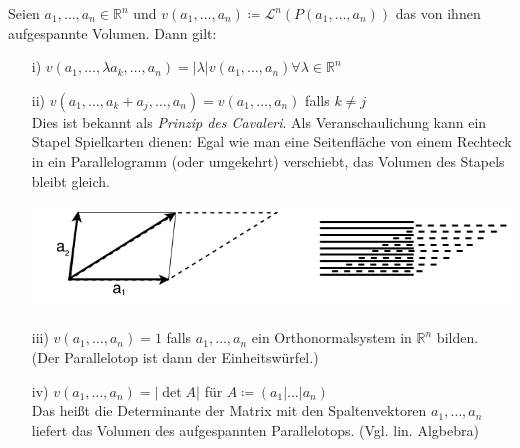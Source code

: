 \begin{satz}
    \mbox{}
    Seien $a_1, \ldots, a_n \in \mathbb{R}^n$ und $v(a_1, \ldots , a_n) \coloneqq \mathcal{L}^n (P (a_1, \ldots, a_n))$ das von ihnen aufgespannte Volumen. Dann gilt:
    \begin{enumerate}
        \item[i)]
            $v(a_1, \ldots, \lambda a_k, \ldots, a_n) = 
            |\lambda| v(a_1, \ldots, a_n) \forall \lambda \in \mathbb{R}^n $
        \item[ii)]
            $v(a_1, \ldots, a_k + a_j, \ldots, a_n) = v(a_1, \ldots, a_n) $
            falls $k \neq j $ \\
            \linebreak
            Dies ist bekannt als \emph{Prinzip des Cavaleri}. Als Veranschaulichung kann
            ein Stapel Spielkarten dienen: Egal wie man eine Seitenfläche von einem Rechteck
            in ein Parallelogramm (oder umgekehrt) verschiebt, 
            das Volumen des Stapels bleibt gleich. \\
            \begin{center}
            	\includegraphics[scale=0.5]{pictures/004-01.png}
            \end{center}
        \item[iii)]
            $v(a_1, \ldots, a_n) = 1 $ falls $a_1, \ldots, a_n $ ein Orthonormalsystem
            in $\mathbb{R}^n $ bilden. \\
            (Der Parallelotop ist dann der Einheitswürfel.)
        \item[iv)]
            $v(a_1, \ldots, a_n) = |\det A|$ für $A \coloneqq (a_1 | \ldots | a_n) $ \\
            \linebreak
            Das heißt die Determinante der Matrix mit den Spaltenvektoren $a_1, \ldots, a_n$
            liefert das Volumen des aufgespannten Parallelotops. (Vgl. lin. Algbebra)
    \end{enumerate}
\end{satz}

